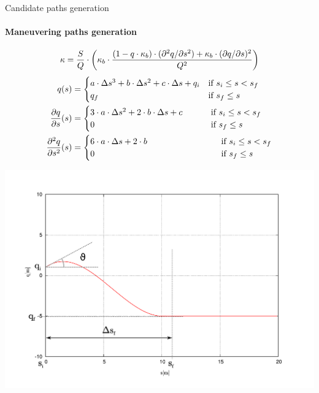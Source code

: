 \begin{frame}{Candidate paths generation}
  \framesubtitle{Maneuvering paths generation}
  \begin{overlayarea}{\textwidth}{\textheight}
     {
    \tiny
    \begin{equation}\nonumber
      \kappa = {S \over Q} \cdot \left ( \kappa_b \cdot { 
      {(1 - q \cdot \kappa_b) \cdot (\partial^2q / \partial s^2) +
      \kappa_b \cdot (\partial q / \partial s )^2
      } 
      \over {Q^2} } \right )
      \end{equation}
    }
     {
      \vskip 0.5cm
      \begin{equation}\nonumber
	\begin{align*}
	q(s) &=
	  \begin{cases}
	  a \cdot \Delta s^3 + b \cdot \Delta s^2 + c \cdot \Delta s + q_i & \text{if } s_i \le s < s_f \\
	  q_f        & \text{if } s_f \le s
	  \end{cases}\\
	{{\partial q} \over {\partial s}}(s) &=
	  \begin{cases}
	  3 \cdot a \cdot \Delta s^2 + 2 \cdot b \cdot \Delta s + c & ~~~~~~~\text{if } s_i \le s < s_f \\
	  0        & ~~~~~~~\text{if } s_f \le s
	  \end{cases}\\
	{{\partial^2 q} \over {\partial s^2}}(s) &=
	  \begin{cases}
	  6 \cdot a \cdot \Delta s + 2 \cdot b & ~~~~~~~~~~~~~~~~~~~~~~~\text{if } s_i \le s < s_f \\
	  0        & ~~~~~~~~~~~~~~~~~~~~~~~\text{if } s_f \le s
	  \end{cases}
	\end{align*}
      \end{equation}
    }
     {
      \begin{center}
	\vskip -0.5cm
	\includegraphics[height=0.4\textheight]{justOneFrenet45}
      \end{center}
    }
    \end{overlayarea}
    


\end{frame}
